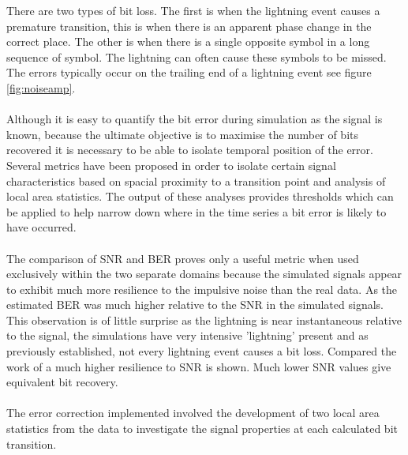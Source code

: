 There are two types of bit loss. The first is when the lightning event causes a premature transition, this is when there is an apparent phase change in the correct place. The other is when there is a single opposite symbol in a long sequence of symbol. The lightning can often cause these symbols to be missed. The errors typically occur on the trailing end of a lightning event see figure \ref{fig:noiseamp}.
\\\\
Although it is easy to quantify the bit error during simulation as the signal is known, because the ultimate objective is to maximise the number of bits recovered it is necessary to be able to isolate temporal position of the error. Several metrics have been proposed in order to isolate certain signal characteristics based on spacial proximity to a transition point and analysis of local area statistics. The output of these analyses provides thresholds which can be applied to help narrow down where in the time series a bit error is likely to have occurred.
\\\\
The comparison of SNR and BER proves only a useful metric when used exclusively within the two separate domains because the simulated signals appear to exhibit much more resilience to the impulsive noise than the real data. As the estimated BER was much higher relative to the SNR in the simulated signals. This observation is of little surprise as the lightning is near instantaneous relative to the signal, the simulations have very intensive 'lightning' present and as previously established, not every lightning event causes a bit loss. Compared the work of \cite{Yang2016} a much higher resilience to SNR is shown. Much lower SNR values give equivalent bit recovery.
\\\\
The error correction implemented involved the development of two local area statistics from the data to investigate the signal properties at each calculated bit transition.  

